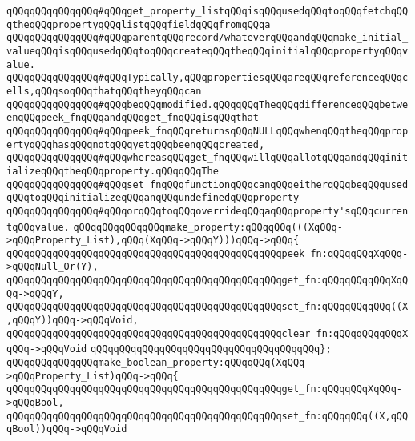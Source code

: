 \verb|qQQqqQQqqQQqqQQq#qQQqget_property_listqQQqisqQQqusedqQQqtoqQQqfetchqQQqtheqQQqpropertyqQQqlistqQQqfieldqQQqfromqQQqa|\newline
\verb|qQQqqQQqqQQqqQQq#qQQqparentqQQqrecord/whateverqQQqandqQQqmake_initial_valueqQQqisqQQqusedqQQqtoqQQqcreateqQQqtheqQQqinitialqQQqpropertyqQQqvalue.|\newline
\verb|qQQqqQQqqQQqqQQq#qQQqTypically,qQQqpropertiesqQQqareqQQqreferenceqQQqcells,qQQqsoqQQqthatqQQqtheyqQQqcan|\newline
\verb|qQQqqQQqqQQqqQQq#qQQqbeqQQqmodified.qQQqqQQqTheqQQqdifferenceqQQqbetweenqQQqpeek_fnqQQqandqQQqget_fnqQQqisqQQqthat|\newline
\verb|qQQqqQQqqQQqqQQq#qQQqpeek_fnqQQqreturnsqQQqNULLqQQqwhenqQQqtheqQQqpropertyqQQqhasqQQqnotqQQqyetqQQqbeenqQQqcreated,|\newline
\verb|qQQqqQQqqQQqqQQq#qQQqwhereasqQQqget_fnqQQqwillqQQqallotqQQqandqQQqinitializeqQQqtheqQQqproperty.qQQqqQQqThe|\newline
\verb|qQQqqQQqqQQqqQQq#qQQqset_fnqQQqfunctionqQQqcanqQQqeitherqQQqbeqQQqusedqQQqtoqQQqinitializeqQQqanqQQqundefinedqQQqproperty|\newline
\verb|qQQqqQQqqQQqqQQq#qQQqorqQQqtoqQQqoverrideqQQqaqQQqproperty'sqQQqcurrentqQQqvalue.|\newline
\newline
\verb|qQQqqQQqqQQqqQQqmake_property:qQQqqQQq(((XqQQq->qQQqProperty_List),qQQq(XqQQq->qQQqY)))qQQq->qQQq{|\newline
\verb|qQQqqQQqqQQqqQQqqQQqqQQqqQQqqQQqqQQqqQQqqQQqqQQqpeek_fn:qQQqqQQqXqQQq->qQQqNull_Or(Y),|\newline
\verb|qQQqqQQqqQQqqQQqqQQqqQQqqQQqqQQqqQQqqQQqqQQqqQQqget_fn:qQQqqQQqqQQqXqQQq->qQQqY,|\newline
\verb|qQQqqQQqqQQqqQQqqQQqqQQqqQQqqQQqqQQqqQQqqQQqqQQqset_fn:qQQqqQQqqQQq((X,qQQqY))qQQq->qQQqVoid,|\newline
\verb|qQQqqQQqqQQqqQQqqQQqqQQqqQQqqQQqqQQqqQQqqQQqqQQqclear_fn:qQQqqQQqqQQqXqQQq->qQQqVoid|\newline
\verb|qQQqqQQqqQQqqQQqqQQqqQQqqQQqqQQqqQQqqQQq};|\newline
\newline
\verb|qQQqqQQqqQQqqQQqmake_boolean_property:qQQqqQQq(XqQQq->qQQqProperty_List)qQQq->qQQq{|\newline
\verb|qQQqqQQqqQQqqQQqqQQqqQQqqQQqqQQqqQQqqQQqqQQqqQQqget_fn:qQQqqQQqXqQQq->qQQqBool,|\newline
\verb|qQQqqQQqqQQqqQQqqQQqqQQqqQQqqQQqqQQqqQQqqQQqqQQqset_fn:qQQqqQQq((X,qQQqBool))qQQq->qQQqVoid|\newline
